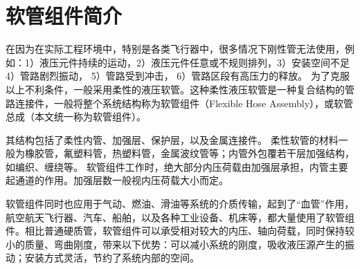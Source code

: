 \section{软管组件简介}

在因为在实际工程环境中，特别是各类飞行器中，很多情况下刚性管无法使用，例如：1）液压元件持续的运动，2）液压元件任意或不规则排列，3）安装空间不足
4）管路剧烈振动，
5）管路受到冲击，
6）管路区段有高压力的释放。
为了克服以上不利条件，一般采用柔性的液压软管。这种柔性液压软管是一种复合结构的管路连接件，一般将整个系统结构称为软管组件（Flexible Hose Assembly），或软管总成（本文统一称为软管组件）。





其结构包括了柔性内管、加强层、保护层，以及金属连接件。
柔性软管的材料一般为橡胶管，氟塑料管，热塑料管，金属波纹管等；内管外包覆若干层加强结构，如编织、缠绕等。
软管组件工作时，绝大部分内压荷载由加强层承担，内管主要起通道的作用。加强层数一般视内压荷载大小而定。


\begin{figure}[!htbp]
	\centering
	\hspace{0.5cm}
	\label{fig:hose}
\end{figure}


软管组件同时也应用于气动、燃油、滑油等系统的介质传输，起到了“血管”作用，航空航天飞行器、汽车、船舶，以及各种工业设备、机床等，都大量使用了软管组件。相比普通硬质管，软管组件可以承受相对较大的内压、轴向荷载，同时保持较小的质量、弯曲刚度，带来以下优势：可以减小系统的刚度，吸收液压源产生的振动；安装方式灵活，节约了系统内部的空间。




